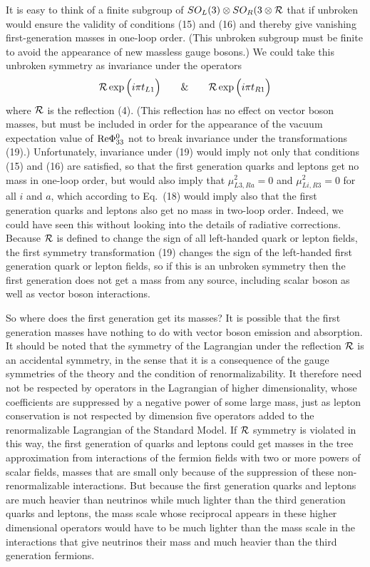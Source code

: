 It is easy to think of a  finite subgroup of $SO_L(3)\otimes SO_R(3 \otimes {\cal R}$ that if unbroken would ensure the validity of conditions (15) and (16) and thereby give vanishing first-generation masses in one-loop order.
(This unbroken subgroup  must be finite to avoid the appearance of new massless gauge bosons.)  We could take this unbroken symmetry as invariance under the operators
\begin{equation}
{\cal R}\exp\Big(i\pi t_{L1}\Big)~~~~~~\&~~~~~~ {\cal R}\exp\Big(i\pi t_{R1}\Big)
\end{equation}
where ${\cal R}$ is the reflection (4).  (This reflection has no effect on vector boson masses, but must be included in order for the appearance of the vacuum expectation value of ${\rm Re}\Phi_{33}^0$ not to break invariance under the transformations (19).)
Unfortunately, invariance under (19) would imply not only that conditions (15) and (16) are satisfied, so that the first generation quarks and leptons get no mass in one-loop order, but would also imply that 
$ \mu^2_{L3,Ra}=0$ and $\mu^2_{Li,R3}=0$ for all $i$ and $a$, which according to Eq.~(18) would imply also that the first generation quarks and leptons also get no mass in two-loop order.  Indeed, we could have seen this without looking into the details of radiative corrections.  Because ${\cal R}$ is defined to change the sign of all left-handed quark or lepton fields, the first  symmetry transformation (19) changes the sign of the left-handed first generation quark or lepton fields, so if this is an unbroken symmetry then the first generation does not get a mass from any source, including scalar boson as well as vector boson interactions.  

So where does the first generation get its masses?    
It is  possible that the first generation masses have nothing to do with vector boson emission and absorption.  It should be noted that the symmetry of the Lagrangian under the reflection  ${\cal R}$ is an accidental symmetry, in the sense that it is a consequence of the gauge symmetries of the theory and the condition of renormalizability.  It therefore need not be respected by operators in the Lagrangian of higher dimensionality, whose coefficients are suppressed by a negative power of some large mass, just as lepton conservation is not respected by dimension five operators added to the renormalizable Lagrangian of the Standard Model.  If ${\cal R}$ symmetry is violated in this way,  the first generation of quarks and leptons could get masses in the tree approximation from interactions of the fermion fields with two or more powers of 
scalar fields, masses that are small only because of the suppression of these non-renormalizable interactions.  But because the first generation quarks and leptons are much heavier than neutrinos while much lighter than the third generation quarks and leptons, the mass scale whose reciprocal appears in these higher dimensional operators would have to be much lighter than the mass scale in the interactions that give neutrinos their mass and much heavier than the third generation fermions.  


